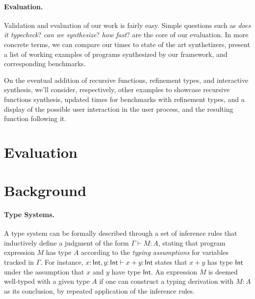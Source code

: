 \documentclass{llncs}
\newcommand{\lolli}{\multimap}
\newcommand{\tensor}{\otimes}
\newcommand{\bang}{{!}}
\newcommand{\mypara}[1]{\paragraph{\textbf{#1}.}}
\begin{document}
\mypara{Evaluation} Validation and evaluation of our work is fairly
easy. Simple questions such as \emph{does it typecheck}? \emph{can
  we synthesize}? \emph{how fast}?  are the core of our evaluation. In
more concrete terms, we can compare our times to state of the art
synthetizers, present a list of working examples of programs synthesized
by our framework, and corresponding benchmarks.

On the eventual addition of recursive functions, refinement types, and
interactive synthesis, we'll consider, respectively, other examples to
showcase recursive functions synthesis, updated times for benchmarks
with refinement types, and a display of the possible user interaction
in the user process, and the resulting function following it.






\section{Evaluation}



\section{Background}\label{sec:background}

\mypara{Type Systems} A type system can be formally described through
a set of inference rules that inductively define a judgment of the
form $\Gamma \vdash M : A$, stating that program expression $M$ has
type $A$ according to the \emph{typing assumptions} for variables
tracked in $\Gamma$. For instance,
$x{:}\mathsf{Int}, y{:}\mathsf{Int} \vdash x+y : \mathsf{Int}$ states
that $x+y$ has type $\mathsf{Int}$ under the assumption that $x$ and
$y$ have type $\mathsf{Int}$.  An expression $M$ is deemed well-typed
with a given type $A$ if one can construct a typing derivation with $M :
A$ as its conclusion, by repeated application of the inference rules.
\end{document}
